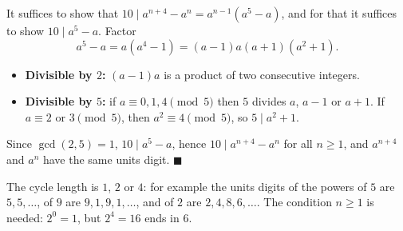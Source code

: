 It suffices to show that $10\mid a^{n+4}-a^n=a^{n-1}\left(a^5-a\right)$, and for that it suffices to show $10\mid a^5-a$. Factor
\[a^5-a=a\left(a^4-1\right)=(a-1)a(a+1)\left(a^2+1\right).\]
\begin{itemize}
\item \textbf{Divisible by $2$:} $(a-1)a$ is a product of two consecutive integers.
\item \textbf{Divisible by $5$:} if $a\equiv0,1,4\pmod5$ then $5$ divides $a$, $a-1$ or $a+1$. If $a\equiv2$ or $3\pmod5$, then $a^2\equiv4\pmod5$, so $5\mid a^2+1$.
\end{itemize}
Since $\gcd(2,5)=1$, $10\mid a^5-a$, hence $10\mid a^{n+4}-a^n$ for all $n\ge1$, and $a^{n+4}$ and $a^n$ have the same units digit. $\blacksquare$

The cycle length is $1$, $2$ or $4$: for example the units digits of the powers of $5$ are $5,5,\dots$, of $9$ are $9,1,9,1,\dots$, and of $2$ are $2,4,8,6,\dots$. The condition $n\ge1$ is needed: $2^0=1$, but $2^4=16$ ends in $6$.
